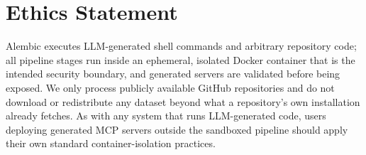 \section*{Ethics Statement}
Alembic executes LLM-generated shell commands and arbitrary repository code; all pipeline stages run inside an ephemeral, isolated Docker container that is the intended security boundary, and generated servers are validated before being exposed. We only process publicly available GitHub repositories and do not download or redistribute any dataset beyond what a repository's own installation already fetches. As with any system that runs LLM-generated code, users deploying generated MCP servers outside the sandboxed pipeline should apply their own standard container-isolation practices.
